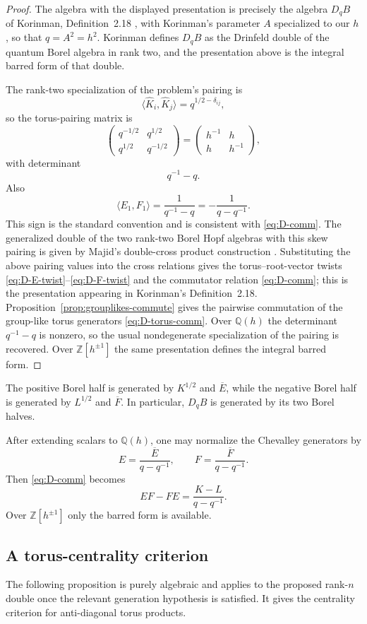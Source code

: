\documentclass[12pt]{article}
\theoremstyle{plain}
\theoremstyle{definition}
\numberwithin{equation}{section}
\newcommand{\Ring}{\mathbb{Z}[h^{\pm 1}]}
\newcommand{\Field}{\mathbb{Q}(h)}
\newcommand{\DqB}{D_qB}
\newcommand{\Khalf}{K^{1/2}}
\newcommand{\Lhalf}{L^{1/2}}
\newcommand{\Ebar}{\overline{E}}
\newcommand{\Fbar}{\overline{F}}
\begin{document}
\begin{proof}
The algebra with the displayed presentation is precisely the algebra \(\DqB\) of Korinman, Definition~2.18 \cite{Korinman}, with Korinman's parameter \(A\) specialized to our \(h\), so that \(q=A^2=h^2\).  Korinman defines \(\DqB\) as the Drinfeld double of the quantum Borel algebra in rank two, and the presentation above is the integral barred form of that double.

The rank-two specialization of the problem's pairing is
\[
\langle \widehat K_i,\widehat K_j\rangle
=
q^{1/2-\delta_{ij}},
\]
so the torus-pairing matrix is
\[
\begin{pmatrix}
q^{-1/2} & q^{1/2}\\
q^{1/2} & q^{-1/2}
\end{pmatrix}
=
\begin{pmatrix}
h^{-1} & h\\
h & h^{-1}
\end{pmatrix},
\]
with determinant
\[
q^{-1}-q.
\]
Also
\[
\langle E_1,F_1\rangle
=
\frac{1}{q^{-1}-q}
=
-\frac{1}{q-q^{-1}}.
\]
This sign is the standard convention and is consistent with \eqref{eq:D-comm}.
The generalized double of the two rank-two Borel Hopf algebras with this skew pairing is given by Majid's double-cross product construction \cite{Majid}.  Substituting the above pairing values into the cross relations gives the torus--root-vector twists \eqref{eq:D-E-twist}--\eqref{eq:D-F-twist} and the commutator relation \eqref{eq:D-comm}; this is the presentation appearing in Korinman's Definition~2.18.  Proposition~\ref{prop:grouplikes-commute} gives the pairwise commutation of the group-like torus generators \eqref{eq:D-torus-comm}.  Over \(\Field\) the determinant \(q^{-1}-q\) is nonzero, so the usual nondegenerate specialization of the pairing is recovered.  Over \(\Ring\) the same presentation defines the integral barred form.
\end{proof}

The positive Borel half is generated by \(\Khalf\) and \(\Ebar\), while the negative Borel half is generated by \(\Lhalf\) and \(\Fbar\).  In particular, \(\DqB\) is generated by its two Borel halves.

After extending scalars to \(\Field\), one may normalize the Chevalley generators by
\[
E=\frac{\Ebar}{q-q^{-1}},
\qquad
F=\frac{\Fbar}{q-q^{-1}}.
\]
Then \eqref{eq:D-comm} becomes
\[
EF-FE=\frac{K-L}{q-q^{-1}}.
\]
Over \(\Ring\) only the barred form is available.

\subsection{A torus-centrality criterion}
\label{sec:centrality-criterion}
The following proposition is purely algebraic and applies to the proposed rank-\(n\) double once the relevant generation hypothesis is satisfied.  It gives the centrality criterion for anti-diagonal torus products.
\end{document}
